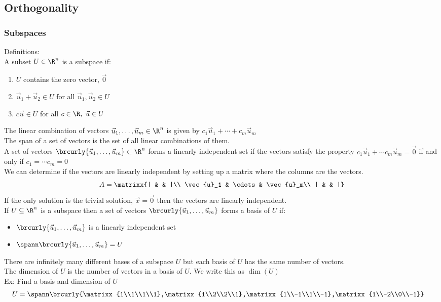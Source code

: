 \subsection{Orthogonality}
\subsubsection{Subspaces}
Definitions:\\
A subset $U\in\R^n$ is a subspace if:
\begin{enumerate}
    \item $U$ contains the zero vector, $\vec{0}$
    \item $\vec{u}_1+\vec{u}_2\in U$ for all $\vec{u}_1,\vec{u}_2\in U$
    \item $c\vec{u}\in U$ for all $c\in\R,\ \vec{u}\in U$
\end{enumerate}
The linear combination of vectors $\vec{u}_1,\ldots,\vec{u}_m\in\R^n$ is given by $c_1\vec{u}_1+\cdots+c_m\vec{u}_m$\\
The span of a set of vectors is the set of all linear combinations of them.\\
A set of vectors $\brcurly{\vec{u}_1,\ldots,\vec{u}_m}\subset\R^n$ forms a linearly independent set if the vectors satisfy the property $c_1\vec{u}_1+\cdots c_m\vec{u}_m=\vec{0}$ if and only if $c_1=\cdots c_m=0$\\
We can determine if the vectors are linearly independent by setting up a matrix where the columns are the vectors.
$$A=\matrixx{| & & |\\ \vec{u}_1 & \cdots & \vec{u}_m\\ | & & |}$$
If the only solution is the trivial solution, $\vec{x}=\vec{0}$ then the vectors are linearly independent.\\
If $U\subseteq\R^n$ is a subspace then a set of vectors $\brcurly{\vec{u}_1,\ldots,\vec{u}_m}$ forms a basis of $U$ if:
\begin{itemize}
    \item $\brcurly{\vec{u}_1,\ldots,\vec{u}_m}$ is a linearly independent set
    \item $\spann\brcurly{\vec{u}_1,\ldots,\vec{u}_m}=U$
\end{itemize}
There are infinitely many different bases of a subspace $U$ but each basis of $U$ has the same number of vectors.\\
The dimension of $U$ is the number of vectors in a basis of $U$. We write this as $\dim(U)$\\
Ex: Find a basis and dimension of $U$
\begin{align*}
    &U=\spann\brcurly{\matrixx{1\\1\\1\\1},\matrixx{1\\2\\2\\1},\matrixx{1\\-1\\1\\-1},\matrixx{1\\-2\\0\\-1}}
\end{align*}
